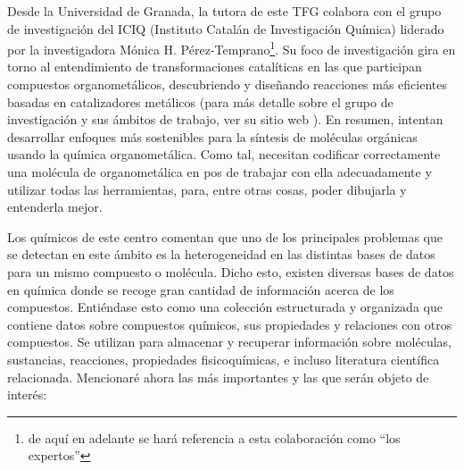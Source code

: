 Desde la Universidad de Granada, la tutora de este TFG colabora con el grupo de investigación del ICIQ (Instituto Catalán de Investigación Química) liderado por la investigadora Mónica H. Pérez-Temprano\footnote{de aquí en adelante se hará referencia a esta colaboración como ``los expertos''}. Su foco de investigación gira en torno al entendimiento de transformaciones catalíticas en las que participan compuestos organometálicos, descubriendo y diseñando reacciones más eficientes basadas en catalizadores metálicos (para más detalle sobre el grupo de investigación y sus ámbitos de trabajo, ver su sitio web \cite{ICIQ}). En resumen, intentan desarrollar enfoques más sostenibles para la síntesis de moléculas orgánicas usando la química organometálica. Como tal, necesitan codificar correctamente una molécula de organometálica en pos de trabajar con ella adecuadamente y utilizar todas las herramientas, para, entre otras cosas, poder dibujarla y entenderla mejor.

Los químicos de este centro comentan que uno de los principales problemas que se detectan en este ámbito es la heterogeneidad en las distintas bases de datos para un mismo compuesto o molécula. Dicho esto, existen diversas bases de datos en química donde se recoge gran cantidad de información acerca de los compuestos. Entiéndase esto como una colección estructurada y organizada que contiene datos sobre compuestos químicos, sus propiedades y relaciones con otros compuestos. Se utilizan para almacenar y recuperar información sobre moléculas, sustancias, reacciones, propiedades fisicoquímicas, e incluso literatura científica relacionada. Mencionaré ahora las más importantes y las que serán objeto de interés:

